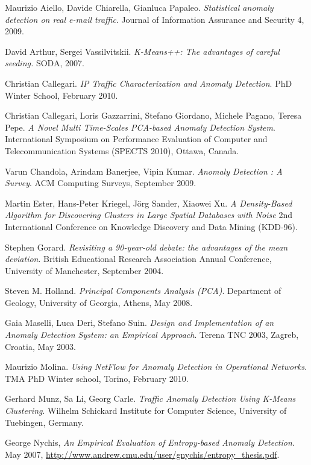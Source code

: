 \documentclass[12pt,a4paper,cucitura]{toptesi}
\begin{document}
\english
\begin{thebibliography}{99}

Maurizio Aiello,
Davide Chiarella,
Gianluca Papaleo.
\emph{Statistical anomaly detection on real e-mail traffic}.
Journal of Information Assurance and Security 4, 2009.

David Arthur,
Sergei Vassilvitskii.
\emph{K-Means++: The advantages of careful seeding.}
SODA, 2007.

Christian Callegari.
\emph{IP Traffic Characterization and Anomaly Detection}.
PhD Winter School, February 2010.

Christian Callegari,
Loris Gazzarrini,
Stefano Giordano,
Michele Pagano,
Teresa Pepe.
\emph{A Novel Multi Time-Scales PCA-based Anomaly Detection System}.
International Symposium on Performance Evaluation of Computer and Telecommunication Systems (SPECTS 2010), Ottawa, Canada.

Varun Chandola,
Arindam Banerjee,
Vipin Kumar.
\emph{Anomaly Detection : A Survey}.
ACM Computing Surveys, September 2009.

Martin Ester, 
Hans-Peter Kriegel, 
Jörg Sander, 
Xiaowei Xu. 
\emph{A Density-Based Algorithm for Discovering Clusters in Large Spatial Databases with Noise}
2nd International Conference on Knowledge Discovery and Data Mining (KDD-96).

Stephen Gorard.
\emph{Revisiting a 90-year-old debate: the advantages of the mean deviation}.
British Educational Research Association Annual Conference, University of Manchester, September 2004.

Steven M. Holland.
\emph{Principal Components Analysis (PCA)}.
Department of Geology, University of Georgia, Athens, May 2008.

Gaia Maselli,
Luca Deri,
Stefano Suin.
\emph{Design and Implementation of an Anomaly Detection System: an Empirical Approach}.
Terena TNC 2003, Zagreb, Croatia, May 2003.

Maurizio Molina.
\emph{Using NetFlow for Anomaly Detection in Operational Networks}.
TMA PhD Winter school, Torino, February 2010.

Gerhard Munz,
Sa Li,
Georg Carle.
\emph{Traffic Anomaly Detection Using K-Means Clustering}.
Wilhelm Schickard Institute for Computer Science, University of Tuebingen, Germany.

George Nychis,
\emph{An Empirical Evaluation of Entropy-based Anomaly Detection}.
May 2007,
\url{http://www.andrew.cmu.edu/user/gnychis/entropy_thesis.pdf}.


\end{thebibliography}
\end{document}
